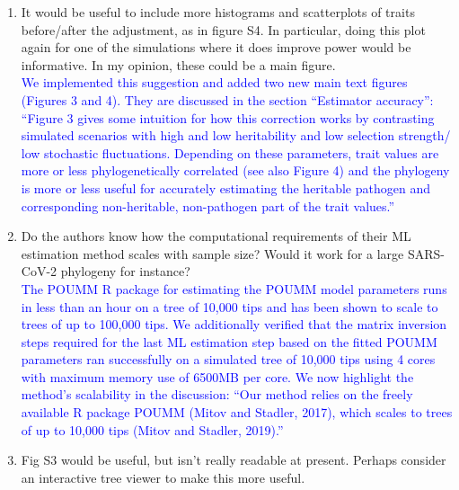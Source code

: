 \documentclass[11pt]{article}
\begin{document}
\begin{enumerate}
    \item It would be useful to include more histograms and scatterplots of traits before/after the adjustment, as in figure S4. In particular, doing this plot again for one of the simulations where it does improve power would be informative. In my opinion, these could be a main figure. \\
    \textcolor{blue}{We implemented this suggestion and added two new main text figures (Figures 3 and 4). They are discussed in the section ``Estimator accuracy'': ``Figure 3 gives some intuition for how this correction works by contrasting simulated scenarios with high and low heritability and low selection strength/ low stochastic fluctuations. Depending on these parameters, trait values are more or less phylogenetically correlated (see also Figure 4) and the phylogeny is more or less useful for accurately estimating the heritable pathogen and corresponding non-heritable, non-pathogen part of the trait values.''}
    \item Do the authors know how the computational requirements of their ML estimation method scales with sample size? Would it work for a large SARS-CoV-2 phylogeny for instance? \\
    \textcolor{blue}{The POUMM R package for estimating the POUMM model parameters runs in less than an hour on a tree of 10,000 tips and has been shown to scale to trees of up to 100,000 tips. We additionally verified that the matrix inversion steps required for the last ML estimation step based on the fitted POUMM parameters ran successfully on a simulated tree of 10,000 tips using 4 cores with maximum memory use of 6500MB per core. We now highlight the method's scalability in the discussion: ``Our method relies on the freely available R package POUMM (Mitov and Stadler, 2017), which scales to trees of up to 10,000 tips (Mitov and Stadler, 2019).''}
    \item Fig S3 would be useful, but isn't really readable at present. Perhaps consider an interactive tree viewer to make this more useful. \\

\end{enumerate}
\end{document}
